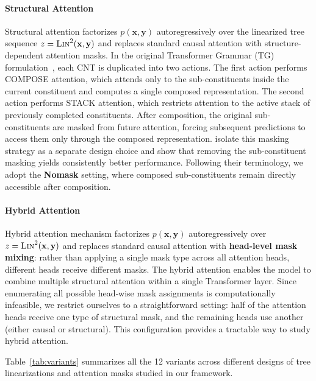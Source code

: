 \documentclass[11pt]{article}
\begin{document}
\paragraph{Structural Attention}
Structural attention factorizes $p(\mathbf{x}, \mathbf{y})$ autoregressively over the linearized tree sequence $z = \textsc{Lin}^2(\mathbf{x}, \mathbf{y})$ and replaces standard causal attention with structure-dependent attention masks. In the original Transformer Grammar (TG) formulation~\cite{sartran-etal-2022-transformer}, each CNT is duplicated into two actions. The first action performs \textsc{COMPOSE} attention, which attends only to the sub-constituents inside the current constituent and computes a single composed representation. The second action performs \textsc{STACK} attention, which restricts attention to the active stack of previously completed constituents. After composition, the original sub-constituents are masked from future attention, forcing subsequent predictions to access them only through the composed representation. \citet{zhao-etal-2025-systematic} isolate this masking strategy as a separate design choice and show that removing the sub-constituent masking yields consistently better performance. Following their terminology, we adopt the \textbf{Nomask} setting, where composed sub-constituents remain directly accessible after composition.

\paragraph{Hybrid Attention} Hybrid attention mechanism factorizes $p(\mathbf{x}, \mathbf{y})$ autoregressively over $z = \textsc{Lin}^2(\mathbf{x}, \mathbf{y})$ and replaces standard causal attention with \textbf{head-level mask mixing}: rather than applying a single mask type across all attention heads, different heads receive different masks. The hybrid attention enables the model to combine multiple structural attention within a single Transformer layer.
Since enumerating all possible head‑wise mask assignments is computationally infeasible, we restrict ourselves to a straightforward setting: half of the attention heads receive one type of structural mask, and the remaining heads use another (either causal or structural). This configuration provides a tractable way to study hybrid attention.

Table~\ref{tab:variants} summarizes all the 12 variants across different designs of tree linearizations and attention masks studied in our framework.
\end{document}

